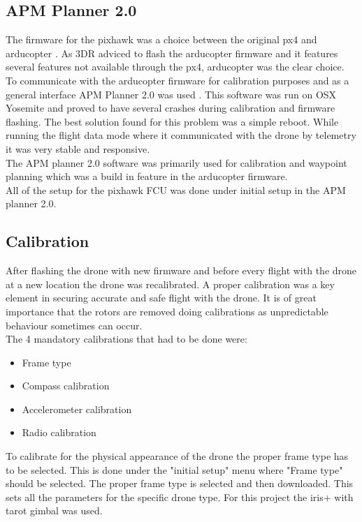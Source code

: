 \subsection*{APM Planner 2.0}
The firmware for the pixhawk was a choice between the original px4 and arducopter \cite{Ref:Arducopter}. As 3DR adviced to flash the arducopter firmware and it features several features not available through the px4, arducopter was the clear choice.\\
To communicate with the arducopter firmware for calibration purposes and as a general interface APM Planner 2.0 was used \cite{Ref:APM2}. This software was run on OSX Yosemite and proved to have several crashes during calibration and firmware flashing. The best solution found for this problem was a simple reboot. While running the flight data mode where it communicated with the drone by telemetry it was very stable and responsive.\\
The APM planner 2.0 software was primarily used for calibration and waypoint planning which was a build in feature in the arducopter firmware.\\
All of the setup for the pixhawk FCU was done under initial setup in the APM planner 2.0.

\subsection*{Calibration}

After flashing the drone with new firmware and before every flight with the drone at a new location the drone was recalibrated. A proper calibration was a key element in securing accurate and safe flight with the drone. It is of great importance that the rotors are removed doing calibrations as unpredictable behaviour sometimes can occur.\\
The 4 mandatory calibrations that had to be done were:
\begin{itemize}
\item Frame type
\item Compass calibration
\item Accelerometer calibration
\item Radio calibration
\end{itemize}

To calibrate for the physical appearance of the drone the proper frame type has to be selected. This is done under the "initial setup" menu where "Frame type" should be selected. The proper frame type is selected and then downloaded. This sets all the parameters for the specific drone type. For this project the iris+ with tarot gimbal was used.\\

